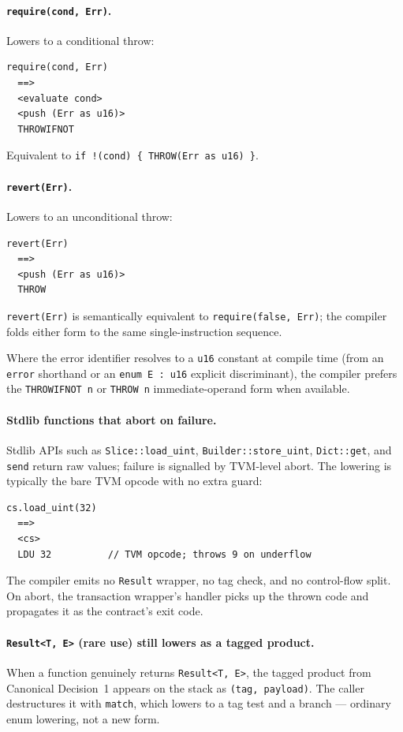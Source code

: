 \documentclass[12pt,oneside]{article}
\begin{document}
\paragraph{\texttt{require(cond, Err)}.}
Lowers to a conditional throw:

\begin{verbatim}
require(cond, Err)
  ==>
  <evaluate cond>
  <push (Err as u16)>
  THROWIFNOT
\end{verbatim}

Equivalent to \verb|if !(cond) { THROW(Err as u16) }|.

\paragraph{\texttt{revert(Err)}.}
Lowers to an unconditional throw:

\begin{verbatim}
revert(Err)
  ==>
  <push (Err as u16)>
  THROW
\end{verbatim}

\verb|revert(Err)| is semantically equivalent to
\verb|require(false, Err)|; the compiler folds either form to the
same single-instruction sequence.

Where the error identifier resolves to a \verb|u16| constant at
compile time (from an \verb|error| shorthand or an \verb|enum E : u16|
explicit discriminant), the compiler prefers the \verb|THROWIFNOT n|
or \verb|THROW n| immediate-operand form when available.

\paragraph{Stdlib functions that abort on failure.}
Stdlib APIs such as \verb|Slice::load_uint|, \verb|Builder::store_uint|,
\verb|Dict::get|, and \verb|send| return raw values; failure is signalled
by TVM-level abort. The lowering is typically the bare TVM opcode with
no extra guard:

\begin{verbatim}
cs.load_uint(32)
  ==>
  <cs>
  LDU 32          // TVM opcode; throws 9 on underflow
\end{verbatim}

The compiler emits no \verb|Result| wrapper, no tag check, and no
control-flow split. On abort, the transaction wrapper's handler picks
up the thrown code and propagates it as the contract's exit code.

\paragraph{\texttt{Result<T, E>} (rare use) still lowers as a tagged
product.}
When a function genuinely returns \verb|Result<T, E>|, the tagged
product from Canonical Decision~1 appears on the stack as
\verb|(tag, payload)|. The caller destructures it with \verb|match|,
which lowers to a tag test and a branch --- ordinary enum lowering,
not a new form.
\end{document}
